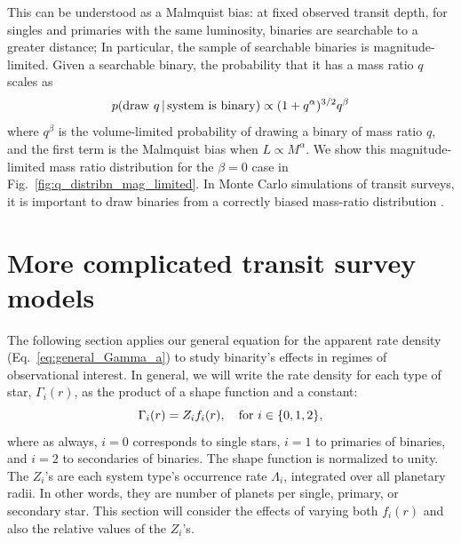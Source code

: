 \documentclass[12pt,modern]{aastex61}
\begin{document}
This can be understood as a Malmquist bias: at fixed observed transit 
depth, for singles and primaries with the same luminosity, binaries are 
searchable to a greater distance;
In particular, the sample of searchable binaries is magnitude-limited.
Given a searchable binary, the probability that it has a mass ratio $q$ 
scales as
\begin{equation}
p({\rm draw\ }q\,|\,{\rm system\ is\ binary}) \propto 
(1+q^\alpha)^{3/2} q^\beta 
\label{eq:Malmquist_bias}
\end{equation}
where $q^\beta$ is the volume-limited probability of drawing a binary of mass 
ratio $q$, and the first term is the Malmquist bias when $L\propto M^\alpha$.
We show this magnitude-limited mass ratio distribution for the $\beta=0$ case 
in Fig.~\ref{fig:q_distribn_mag_limited}.
In Monte Carlo simulations of transit surveys, it is 
important to draw binaries from a correctly biased mass-ratio distribution 
\citep[\textit{e.g.},][]{bakos_hatsouth:_2013,sullivan_transiting_2015,
    gunther_new_2017}.



%

\section{More complicated transit survey models}
\label{sec:more_complicated}
The following section applies our general equation for the apparent rate 
density (Eq.~\ref{eq:general_Gamma_a}) to study binarity's effects in regimes 
of observational interest.
In general, we will write the rate density for each type of star, 
$\Gamma_i(r)$, as the product of a shape function and a constant:
\begin{equation}
\Gamma_i(r) = Z_i f_i(r), \quad {\rm for\ }i\in\{0,1,2\},
\end{equation}
where as always, $i=0$ corresponds to single stars, $i=1$ to primaries of 
binaries, and $i=2$ to secondaries of binaries.
The shape function is normalized to unity.
The $Z_i$'s are each system type's occurrence rate $\Lambda_i$, integrated 
over all planetary radii. In other words, they are number of planets per 
single, primary, or secondary star.
This section will consider the effects of varying both $f_i(r)$ and also the
relative values of the $Z_i$'s.

\end{document}
